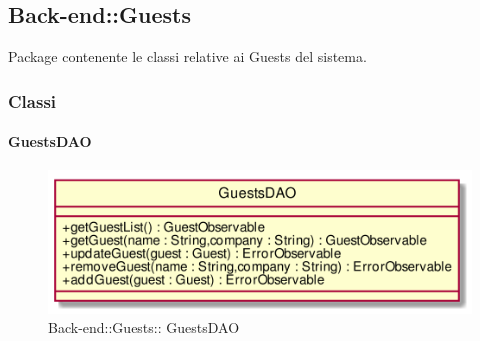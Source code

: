 \subsection{Back-end::Guests}
Package contenente le classi relative ai Guests del sistema.
\subsubsection{Classi}
\hypertarget{ GuestsDAO_label}{\paragraph{ GuestsDAO}}
\begin{figure}[h]
	\centering
	\includegraphics[width=\textwidth,height=\textheight,keepaspectratio]{images/Class_GuestsDAO.png}
	\caption{Back-end::Guests:: GuestsDAO}
\end{figure}
